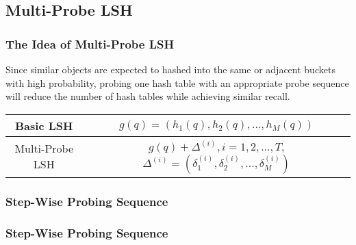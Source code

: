 \subsection{Multi-Probe LSH}
\begin{frame}
\frametitle{The Idea of Multi-Probe LSH}
	Since similar objects are expected to hashed into the same or adjacent buckets with high probability, probing one hash table with an appropriate probe sequence will reduce the number of hash tables while achieving similar recall.
\begin{table}
\begin{tabular}{cc}
\hline
  Basic LSH& $g(q)=(h_1(q), h_2(q), ..., h_M(q))$ \\ \hline
  Multi-Probe LSH& $g(q){+}\Delta^{(i)}, i{=}1,2,...,T$, $\Delta^{(i)}{=}(\delta_1^{(i)}, \delta_2^{(i)}, ..., \delta_M^{(i)})$ \\ \hline
\end{tabular}
\end{table}
\end{frame}

\begin{frame}
	\frametitle{Step-Wise Probing Sequence}
\end{frame}

\begin{frame}
	\frametitle{Step-Wise Probing Sequence}
\end{frame}
